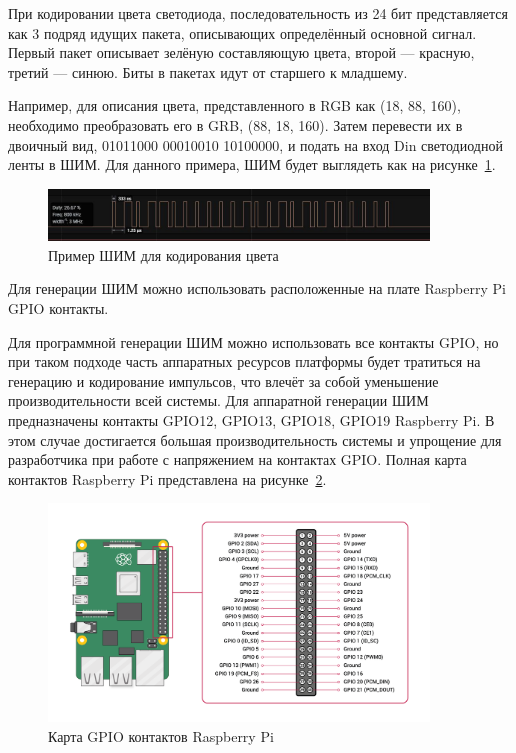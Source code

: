 При кодировании цвета светодиода, последовательность из 24 бит представляется как 3 подряд идущих пакета, описывающих определённый основной сигнал. Первый пакет описывает зелёную составляющую цвета, второй --- красную, третий --- синюю. Биты в пакетах идут от старшего к младшему.

Например, для описания цвета, представленного в RGB как (18, 88, 160), необходимо преобразовать его в GRB, (88, 18, 160). Затем перевести их в двоичный вид, 01011000 00010010 10100000, и подать на вход Din светодиодной ленты в ШИМ. Для данного примера, ШИМ будет выглядеть как на рисунке~\ref{img:WS2812__PWM_example}.

\begin{figure}[H]
  \centering
  \includegraphics[width=0.9\textwidth]{assets/images/practical/PWM__example.jpg}
  \caption{Пример ШИМ для кодирования цвета}
  \label{img:WS2812__PWM_example}
\end{figure}

Для генерации ШИМ можно использовать расположенные на плате Raspberry Pi GPIO контакты.

Для программной генерации ШИМ можно использовать все контакты GPIO, но при таком подходе часть аппаратных ресурсов платформы будет тратиться на генерацию и кодирование импульсов, что влечёт за собой уменьшение производительности всей системы. Для аппаратной генерации ШИМ предназначены контакты GPIO12, GPIO13, GPIO18, GPIO19 Raspberry Pi. В этом случае достигается большая производительность системы и упрощение для разработчика при работе с напряжением на контактах GPIO. Полная карта контактов Raspberry Pi представлена на рисунке~\ref{img:raspberrypi__GPIO_pinout_diagram}.

\begin{figure}[H]
  \centering
  \includegraphics[width=0.9\textwidth]{assets/images/practical/GPIO-Pinout-Diagram.png}
  \caption{Карта GPIO контактов Raspberry Pi}
  \label{img:raspberrypi__GPIO_pinout_diagram}
\end{figure}

